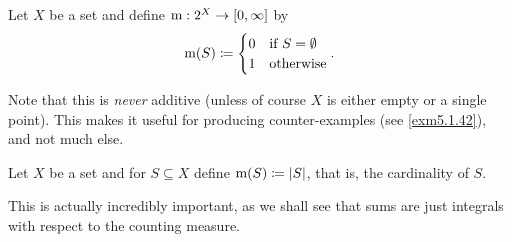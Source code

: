 \begin{exm}\label{UnitMeasure}
Let $X$ be a set and define $\mathrm{m} :2^X\rightarrow [0,\infty ]$ by
\begin{equation}
\mathrm{m} (S)\coloneqq \begin{cases}0 & \text{if }S=\emptyset \\ 1 & \text{otherwise}\end{cases}.
\end{equation}
\begin{rmk}
Note that this is \emph{never} additive (unless of course $X$ is either empty or a single point).  This makes it useful for producing counter-examples (see \cref{exm5.1.42}), and not much else.
\end{rmk}
\end{exm}
\begin{exm}
Let $X$ be a set and for $S\subseteq X$ define $\mathrm{m} (S)\coloneqq \lvert S\rvert$, that is, the cardinality of $S$.
\begin{rmk}
This is actually incredibly important, as we shall see that sums are just integrals with respect to the counting measure.
\end{rmk}
\end{exm}

